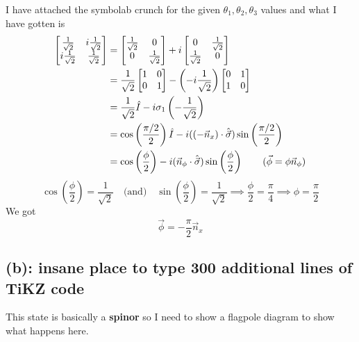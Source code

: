 \documentclass[letter, 10pts]{article}
\begin{document}
I have attached the symbolab crunch for the given $\theta_1, \theta_2, \theta_3$ values and what I have gotten is
\begin{align*}
	\begin{bmatrix} \frac{1}{\sqrt{2} } & 
	i \frac{1}{\sqrt{2} } \\ 
i \frac{1}{\sqrt{2} } & \frac{1}{\sqrt{2} } \end{bmatrix}  &= 
\begin{bmatrix} 
	\frac{1}{\sqrt{2} } & 0  \\ 
	0  & 
	\frac{1}{\sqrt{2} }  
\end{bmatrix} 
	+ i \begin{bmatrix} 0 & \frac{1}{\sqrt{2} } \\ \frac{1}{\sqrt{2} } & 0 \end{bmatrix}  \\ 
	&=  
	\frac{1}{\sqrt{2} } 
	\begin{bmatrix} 1 & 0 \\ 0 & 1 \end{bmatrix}  - \left(- i \frac{1}{\sqrt{2} }\right)
	\begin{bmatrix} 0 & 1 \\ 1 & 0 \end{bmatrix}  \\
	&= 
\frac{1}{\sqrt{2} } \hat{I}  -  i \sigma_1\left(-  \frac{1}{\sqrt{2} }\right) 
	\\ 
	&= 
\cos \left(
\frac{\pi / 2}{2}
\right) \hat{I} - i ((-\vec{n}_x) \cdot \hat{\vec{\sigma}}) \sin \left(
\frac{\pi / 2}{2}
\right)
	\\ 
	&= 
\cos
\left(\frac{\phi}{2}\right) - i (\vec{n}_\phi \cdot \hat{\vec{\sigma}}) 
\sin\left(\frac{\phi}{2}\right) \tag{$\vec{\phi} = \phi \vec{n}_\phi$}
	\\
\end{align*}
\[
\cos \left( \frac{\phi}{2}\right)  = \frac{1}{\sqrt{2} } \quad \text{(and)} \quad 
\sin \left(\frac{\phi}{2}\right) =  \frac{1}{\sqrt{2} } \implies \frac{\phi}{2} = \frac{\pi}{4} \implies \phi =  \frac{\pi}{2} 
\]
We got 
\[
\boxed{
\vec{\phi} =  - \frac{\pi }{2} \vec{n}_x 
}
\] 


\newpage 
\subsection*{(b): insane place to type 300 additional lines of TiKZ code} 

This state is basically a \textbf{spinor} so I need to show a flagpole diagram to show what happens here. 
\end{document}
